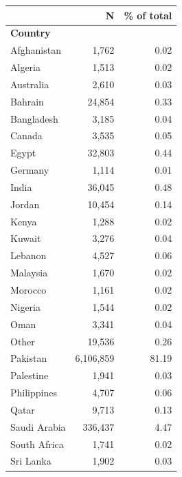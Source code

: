 \begin{tabular}{lrr}


\toprule


 & N & \% of total \\


\midrule


\multicolumn{3}{l}{\textbf{Country}}\\ 
\midrule
Afghanistan         &       1,762&        0.02\\
Algeria             &       1,513&        0.02\\
Australia           &       2,610&        0.03\\
Bahrain             &      24,854&        0.33\\
Bangladesh          &       3,185&        0.04\\
Canada              &       3,535&        0.05\\
Egypt               &      32,803&        0.44\\
Germany             &       1,114&        0.01\\
India               &      36,045&        0.48\\
Jordan              &      10,454&        0.14\\
Kenya               &       1,288&        0.02\\
Kuwait              &       3,276&        0.04\\
Lebanon             &       4,527&        0.06\\
Malaysia            &       1,670&        0.02\\
Morocco             &       1,161&        0.02\\
Nigeria             &       1,544&        0.02\\
Oman                &       3,341&        0.04\\
Other               &      19,536&        0.26\\
Pakistan            &   6,106,859&       81.19\\
Palestine           &       1,941&        0.03\\
Philippines         &       4,707&        0.06\\
Qatar               &       9,713&        0.13\\
Saudi Arabia        &     336,437&        4.47\\
South Africa        &       1,741&        0.02\\
Sri Lanka           &       1,902&        0.03\\

\end{tabular}
